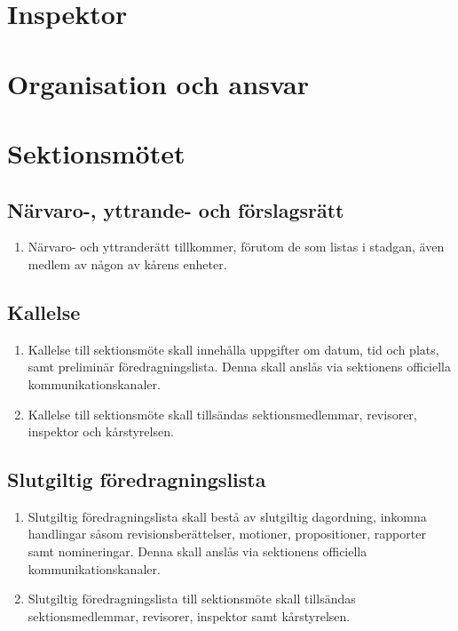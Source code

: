 \documentclass[11pt,a4paper]{article}
\begin{document}
\newpage

\section{Inspektor}

\section{Organisation och ansvar}


\newpage

\section{Sektionsmötet}

\subsection{Närvaro-, yttrande- och förslagsrätt}

\begin{enumerate}[\thesubsection .1]

  \item Närvaro- och yttranderätt tillkommer, förutom de som listas i stadgan, även medlem av någon av kårens enheter.

\end{enumerate}


\subsection{Kallelse}

\begin{enumerate}[\thesubsection .1]

\item Kallelse till sektionsmöte  skall innehålla uppgifter om datum, tid och plats, samt preliminär föredragningslista. Denna skall anslås via sektionens officiella kommunikationskanaler.

\item Kallelse till sektionsmöte skall tillsändas sektionsmedlemmar, revisorer, inspektor och kårstyrelsen.

\end{enumerate}

\subsection{Slutgiltig föredragningslista}
\begin{enumerate}[\thesubsection .1]

\item Slutgiltig föredragningslista skall bestå av slutgiltig dagordning, inkomna handlingar såsom revisionsberättelser, motioner, propositioner, rapporter samt nomineringar. Denna skall anslås via sektionens officiella kommunikationskanaler.

\item Slutgiltig föredragningslista till sektionsmöte skall tillsändas sektionsmedlemmar, revisorer, inspektor samt kårstyrelsen.

\end{enumerate}
\end{document}
